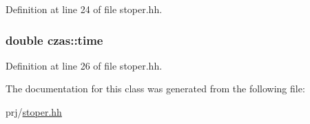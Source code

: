 \-Definition at line 24 of file stoper.\-hh.

\hypertarget{classczas_a1348fd4948270410b3087bb0318bd147}{
\subsubsection[{time}]{\setlength{\rightskip}{0pt plus 5cm}double {\bf czas\-::time}}}\label{classczas_a1348fd4948270410b3087bb0318bd147}


\-Definition at line 26 of file stoper.\-hh.



\-The documentation for this class was generated from the following file\-:\begin{DoxyCompactItemize}
\item 
prj/\hyperlink{stoper_8hh}{stoper.\-hh}\end{DoxyCompactItemize}
